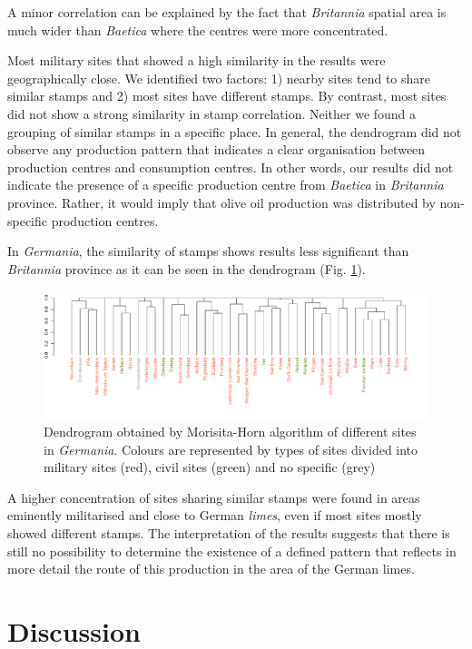\documentclass[review]{elsarticle}
\begin{document}
A minor correlation can be explained by the fact that \textit{Britannia} spatial area is much wider than \textit{Baetica} where the centres were more concentrated.

Most military sites that showed a high similarity in the results were geographically close. We identified two factors: 1) nearby sites tend to share similar stamps and 2) most sites have different stamps. 
By contrast, most sites did not show a strong similarity in stamp correlation. Neither we found a grouping of similar stamps in a specific place. In general, the dendrogram did not observe any production pattern that indicates a clear organisation between production centres and consumption centres. In other words, our results did not indicate the presence of a specific production centre from \textit{Baetica} in \textit{Britannia} province. Rather, it would imply that olive oil production was distributed by non-specific production centres. 


In \textit{Germania}, the similarity of stamps shows results less significant than \textit{Britannia} province as it can be seen in the dendrogram (Fig. \ref{germap}). 

\begin{figure}
	\centering
\includegraphics[angle=180, width=\linewidth]{figs/dendroger5.pdf}
\caption{Dendrogram obtained by Morisita-Horn algorithm of different sites in \textit{Germania}. Colours are represented by types of sites divided into military sites (red), civil sites (green) and no specific (grey)}
\label{germap}
\end{figure}

A higher concentration of sites sharing similar stamps were found in areas eminently militarised and close to German \textit{limes}, even if most sites mostly showed different stamps.
The interpretation of the results suggests that there is still no possibility to determine the existence of a defined pattern that reflects in more detail the route of this production in the area of the German limes.


\section{Discussion}
\end{document}
